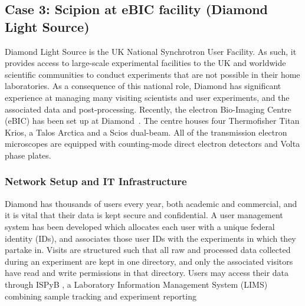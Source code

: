 
\subsection{Case 3: Scipion at eBIC facility (Diamond Light Source)}

Diamond Light Source is the UK National Synchrotron User Facility.  As such, it provides access to large-scale experimental facilities to the UK and worldwide scientific communities to conduct experiments that are not possible in their home laboratories.  As a consequence of this national role, Diamond has significant experience at managing many visiting scientists and user experiments, and the associated data and post-processing.  %
Recently, the electron Bio-Imaging Centre (eBIC) has been set up at Diamond~\citep{diamond2017}. The centre houses four Thermofisher Titan Krios, a Talos Arctica and a Scios dual-beam. All of the transmission electron microscopes are equipped with counting-mode direct electron detectors and Volta phase plates. 

\subsubsection{Network Setup and IT Infrastructure}

Diamond has thousands of users every year, both academic and commercial, and it is vital that their data is kept secure and confidential. A user management system has been developed which allocates each user with a unique federal identity (IDs), and associates those user IDs with the experiments in which they partake in. Visits are structured such that all raw and processed data collected during an experiment are kept in one directory, and only the associated visitors have read and write permissions in that directory. Users may access their data through ISPyB \citep{ispb2011},  a Laboratory Information Management System (LIMS) combining sample tracking and experiment reporting  %

